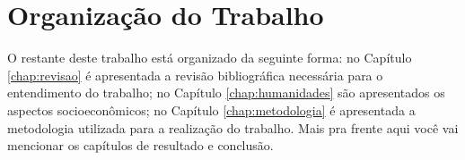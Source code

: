 	\section{Organização do Trabalho}\label{sec:introducao:organizacao}

		O restante deste trabalho está organizado da seguinte forma: no Capítulo \ref{chap:revisao} é apresentada a revisão bibliográfica necessária para o entendimento do trabalho; no Capítulo \ref{chap:humanidades} são apresentados os aspectos socioeconômicos; no Capítulo \ref{chap:metodologia} é apresentada a metodologia utilizada para a realização do trabalho. {\color{red} Mais pra frente aqui você vai mencionar os capítulos de resultado e conclusão.}
		
